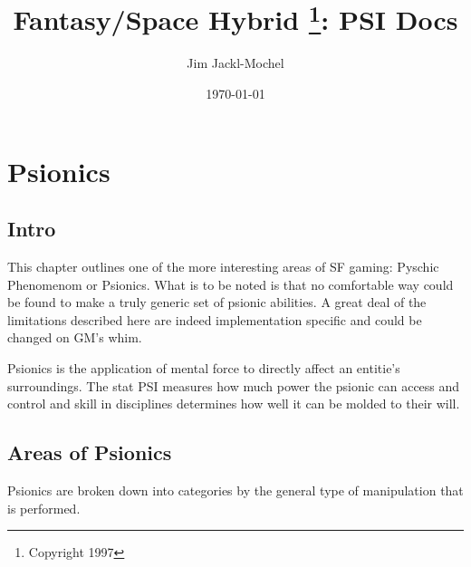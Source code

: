 \documentclass{book}
\title{Fantasy/Space Hybrid \thanks{Copyright 1997}: PSI Docs}
\author{Jim Jackl-Mochel}
\date{\today}
\begin{document}

\tableofcontents
\listoftables




\chapter{Psionics}

\section{Intro}


This chapter outlines one of the more interesting areas of SF gaming: 
Pyschic Phenomenom or Psionics. What is to be noted is that no 
comfortable way could be found to make a truly generic set of psionic 
abilities. A great deal of the limitations described here are indeed 
implementation specific and could be changed on GM's whim.

Psionics is the application of mental force to directly affect an entitie's
surroundings. The stat PSI measures how much power the psionic can access and control
and skill in disciplines determines how well it can be molded to their will.

\section{Areas of Psionics}

Psionics are broken down into categories by the general type of
manipulation that is performed.
\end{document}
